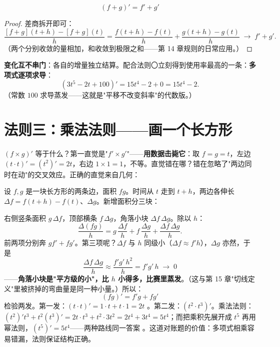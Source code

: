 \[
\boxed{\;(f + g)' = f' + g'\;}
\]
\begin{proof}
差商拆开即可：
\[
\frac{[f+g](t+h) - [f+g](t)}{h} = \frac{f(t+h)-f(t)}{h} + \frac{g(t+h)-g(t)}{h} \;\longrightarrow\; f' + g' .
\]
（两个分别收敛的量相加，和收敛到极限之和——第 14 章规则的日常应用。）
\end{proof}
\textbf{变化互不串门}：各自的增量独立结算。配合法则〇立刻得到使用率最高的一条：\textbf{多项式逐项求导}：
\[
\left(3t^5 - 2t + 100\right)' = 15t^4 - 2 + 0 = 15t^4 - 2 .
\]
（常数 $100$ 求导蒸发——这就是"平移不改变斜率"的代数版。）

\section{法则三：乘法法则——画一个长方形}

$(f\times g)'$ 等于什么？第一直觉是"$f'\times g'$"——\textbf{用数据击毙它}：取 $f = g = t$，左边 $(t\cdot t)' = (t^2)' = 2t$，右边 $1\times1 = 1$，不等。直觉错在哪？错在忽略了"两边同时在动"的交叉效应。正确的直觉来自几何：

设 $f, g$ 是一块长方形的两条边，面积 $fg$。时间从 $t$ 走到 $t+h$，两边各伸长 $\Delta f = f(t+h)-f(t)$、$\Delta g$。新增面积分三块：

\begin{center}
\end{center}

右侧竖条面积 $g\,\Delta f$，顶部横条 $f\,\Delta g$，角落小块 $\Delta f\,\Delta g$。除以 $h$：
\[
\frac{\Delta(fg)}{h} = g\,\frac{\Delta f}{h} + f\,\frac{\Delta g}{h} + \frac{\Delta f\,\Delta g}{h} .
\]
前两项分别奔 $g f' + f g'$。第三项呢？$\Delta f$ 与 $h$ 同级小（$\Delta f \approx f'h$），$\Delta g$ 亦然，于是
\[
\frac{\Delta f\,\Delta g}{h} \approx \frac{f'g'\,h^2}{h} = f'g'\,h \;\longrightarrow\; 0
\]
——\textbf{角落小块是"平方级的小"，比 $h$ 小得多，比赛里蒸发}。（这与第 15 章"切线定义"里被挤掉的弯曲量是同一种小量。）所以：
\[
\boxed{\;(fg)' = f'g + fg'\;}
\]
检验两发。第一发：$(t\cdot t)' = 1\cdot t + t\cdot 1 = 2t$ \checkmark。第二发：$(t^2\cdot t^3)'$。乘法法则：$(t^2)'t^3 + t^2(t^3)' = 2t\cdot t^3 + t^2\cdot 3t^2 = 2t^4 + 3t^4 = 5t^4$；而把乘积先展开成 $t^5$ 再用幂法则，$(t^5)' = 5t^4$——两种路线同一答案 \checkmark。这道对账题的价值：多项式相乘容易错漏，法则保证结构正确。

